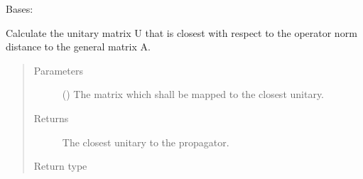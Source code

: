 \documentclass[letterpaper,10pt,english]{sphinxmanual}
\begin{document}

\begin{fulllineitems}
\label{\detokenize{qsim:qsim.matrix.SparseOperator}}
Bases: {\hyperref[\detokenize{qsim:qsim.matrix.OperatorMatrix}]{}}

\end{fulllineitems}


\begin{fulllineitems}
\label{\detokenize{qsim:qsim.matrix.closest_unitary}}
Calculate the unitary matrix U that is closest with respect to the
operator norm distance to the general matrix A.
\begin{quote}\begin{description}
\item[{Parameters}] \leavevmode
{} ({\hyperref[\detokenize{qsim:qsim.matrix.OperatorMatrix}]{}}) \textendash{} The matrix which shall be mapped to the closest unitary.

\item[{Returns}] \leavevmode
{} \textendash{} The closest unitary to the propagator.

\item[{Return type}] \leavevmode
{\hyperref[\detokenize{qsim:qsim.matrix.OperatorMatrix}]{}}

\end{description}\end{quote}

\end{fulllineitems}

\end{document}
